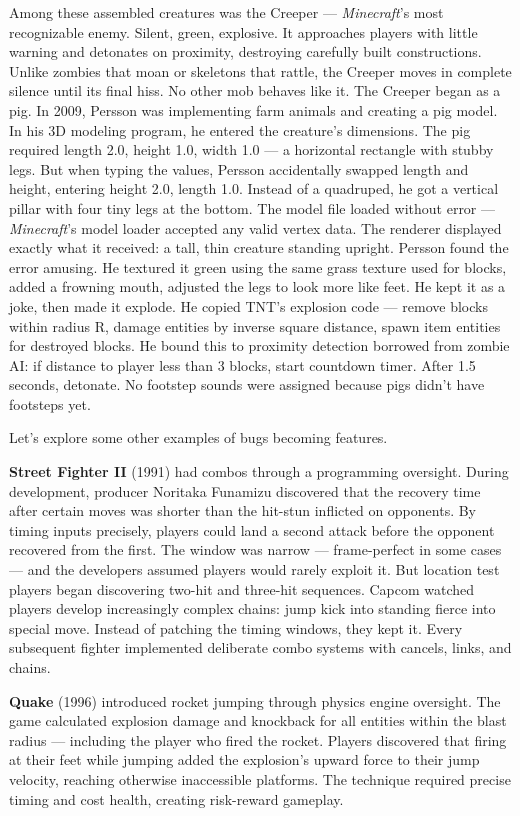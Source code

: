 Among these assembled creatures was the Creeper — \emph{Minecraft}'s most recognizable enemy. Silent, green, explosive. It approaches players with little warning and detonates on proximity, destroying carefully built constructions. Unlike zombies that moan or skeletons that rattle, the Creeper moves in complete silence until its final hiss. No other mob behaves like it. The Creeper began as a pig. In 2009, Persson was implementing farm animals and creating a pig model. In his 3D modeling program, he entered the creature's dimensions. The pig required length 2.0, height 1.0, width 1.0 — a horizontal rectangle with stubby legs. But when typing the values, Persson accidentally swapped length and height, entering height 2.0, length 1.0. Instead of a quadruped, he got a vertical pillar with four tiny legs at the bottom. The model file loaded without error — \emph{Minecraft}'s model loader accepted any valid vertex data. The renderer displayed exactly what it received: a tall, thin creature standing upright. Persson found the error amusing. He textured it green using the same grass texture used for blocks, added a frowning mouth, adjusted the legs to look more like feet. He kept it as a joke, then made it explode. He copied TNT's explosion code — remove blocks within radius R, damage entities by inverse square distance, spawn item entities for destroyed blocks. He bound this to proximity detection borrowed from zombie AI: if distance to player less than 3 blocks, start countdown timer. After 1.5 seconds, detonate. No footstep sounds were assigned because pigs didn't have footsteps yet.

Let's explore some other examples of bugs becoming features.

\textbf{Street Fighter II} (1991) had combos through a programming oversight. During development, producer Noritaka Funamizu discovered that the recovery time after certain moves was shorter than the hit-stun inflicted on opponents. By timing inputs precisely, players could land a second attack before the opponent recovered from the first. The window was narrow — frame-perfect in some cases — and the developers assumed players would rarely exploit it. But location test players began discovering two-hit and three-hit sequences. Capcom watched players develop increasingly complex chains: jump kick into standing fierce into special move. Instead of patching the timing windows, they kept it.  Every subsequent fighter implemented deliberate combo systems with cancels, links, and chains.

\textbf{Quake} (1996) introduced rocket jumping through physics engine oversight. The game calculated explosion damage and knockback for all entities within the blast radius — including the player who fired the rocket. Players discovered that firing at their feet while jumping added the explosion's upward force to their jump velocity, reaching otherwise inaccessible platforms. The technique required precise timing and cost health, creating risk-reward gameplay.

